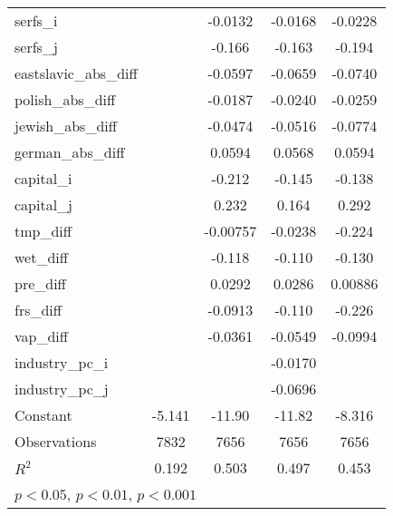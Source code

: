 {\begin{longtable}{l*{4}{c}}
serfs\_i             &                     &     -0.0132         &     -0.0168         &     -0.0228         \\
serfs\_j             &                     &      -0.166\sym{***}&      -0.163\sym{***}&      -0.194\sym{***}\\
eastslavic\_abs\_diff &                     &     -0.0597\sym{***}&     -0.0659\sym{***}&     -0.0740\sym{***}\\
polish\_abs\_diff     &                     &     -0.0187         &     -0.0240         &     -0.0259         \\
jewish\_abs\_diff     &                     &     -0.0474         &     -0.0516         &     -0.0774\sym{**} \\
german\_abs\_diff     &                     &      0.0594\sym{**} &      0.0568\sym{**} &      0.0594\sym{**} \\
capital\_i           &                     &      -0.212         &      -0.145         &      -0.138         \\
capital\_j           &                     &       0.232         &       0.164         &       0.292         \\
tmp\_diff            &                     &    -0.00757         &     -0.0238         &      -0.224\sym{***}\\
wet\_diff            &                     &      -0.118\sym{***}&      -0.110\sym{***}&      -0.130\sym{***}\\
pre\_diff            &                     &      0.0292\sym{***}&      0.0286\sym{***}&     0.00886\sym{*}  \\
frs\_diff            &                     &     -0.0913         &      -0.110         &      -0.226\sym{**} \\
vap\_diff            &                     &     -0.0361         &     -0.0549         &     -0.0994         \\
industry\_pc\_i       &                     &                     &     -0.0170         &                     \\
industry\_pc\_j       &                     &                     &     -0.0696         &                     \\
Constant            &      -5.141\sym{***}&      -11.90\sym{***}&      -11.82\sym{***}&      -8.316\sym{***}\\
\hline
Observations        &        7832         &        7656         &        7656         &        7656         \\
\(R^{2}\)           &       0.192         &       0.503         &       0.497         &       0.453         \\
\hline\hline
\multicolumn{5}{l}{\footnotesize \sym{*} \(p<0.05\), \sym{**} \(p<0.01\), \sym{***} \(p<0.001\)}\\
\end{longtable}
}
